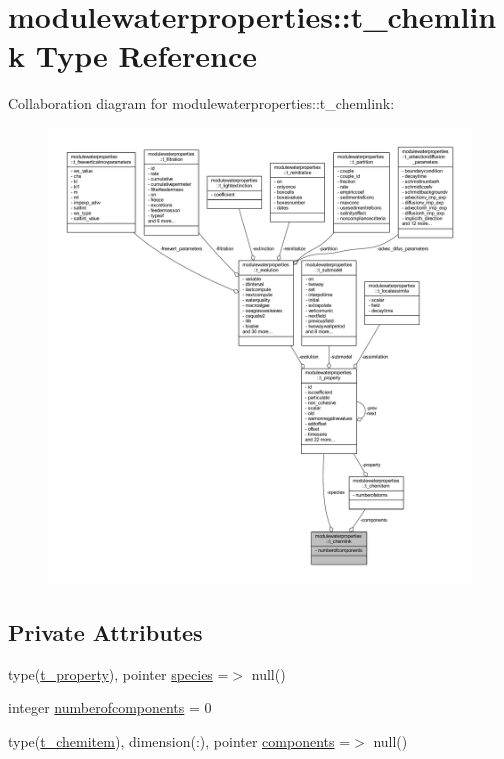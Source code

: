 \hypertarget{structmodulewaterproperties_1_1t__chemlink}{}\section{modulewaterproperties\+:\+:t\+\_\+chemlink Type Reference}
\label{structmodulewaterproperties_1_1t__chemlink}


Collaboration diagram for modulewaterproperties\+:\+:t\+\_\+chemlink\+:\nopagebreak
\begin{figure}[H]
\begin{center}
\leavevmode
\includegraphics[width=350pt]{structmodulewaterproperties_1_1t__chemlink__coll__graph}
\end{center}
\end{figure}
\subsection*{Private Attributes}
\begin{DoxyCompactItemize}
\item 
type(\mbox{\hyperlink{structmodulewaterproperties_1_1t__property}{t\+\_\+property}}), pointer \mbox{\hyperlink{structmodulewaterproperties_1_1t__chemlink_a76fceac68ee362ecafc5052419d7753c}{species}} =$>$ null()
\item 
integer \mbox{\hyperlink{structmodulewaterproperties_1_1t__chemlink_a9dd3687d15c191e41870cf05c5bfd2c0}{numberofcomponents}} = 0
\item 
type(\mbox{\hyperlink{structmodulewaterproperties_1_1t__chemitem}{t\+\_\+chemitem}}), dimension(\+:), pointer \mbox{\hyperlink{structmodulewaterproperties_1_1t__chemlink_a3f3da10fdfad8b29cc11b6332302bfed}{components}} =$>$ null()
\end{DoxyCompactItemize}


